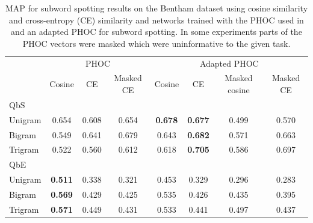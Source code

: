 \documentclass[ms,electronic,twosidetoc,letterpaper,chaptercenter,parttop,lof,lot]{byumsphd}
\begin{document}
\begin{table}
\centering
\begin{tabular}{| l | c c c | c c c c |}
  \hline
   & \multicolumn{3}{c|}{PHOC \cite{sudholt2017}} & \multicolumn{4}{c|}{Adapted PHOC}\\
   & Cosine & CE & Masked CE & Cosine & CE & Masked cosine & Masked CE   \\
  \hline   
  \hline 
  QbS & & & & & & & \\
  \hline
Unigram &  0.654 &  0.608 &  0.654 &  \textbf{0.678} &  \textbf{0.677} &  0.499 &  0.570 \\
Bigram  &  0.549 &  0.641 &  0.679 &  0.643 &  \textbf{0.682} &  0.571 &  0.663 \\
Trigram &  0.522 &  0.560 &  0.612 &  0.618 &  \textbf{0.705} &  0.586 &  0.697 \\
\hline


\hline 
  QbE & & & & & & & \\
  \hline
Unigram &  \textbf{0.511} &  0.338 & 0.321 &  0.453 &  0.329  &  0.296 &  0.283 \\
Bigram  &  \textbf{0.569} &  0.429 & 0.425 &  0.535 &  0.426  &  0.435 &  0.395 \\
Trigram &  \textbf{0.571} &  0.449 & 0.431 &  0.533 &  0.441  &  0.497 &  0.437 \\
\hline

\end{tabular}
\caption{MAP for subword spotting results on the Bentham dataset using cosine similarity and cross-entropy (CE) similarity and networks trained with the PHOC used in \cite{sudholt2017} and an adapted PHOC for subword spotting. In some experiments parts of the PHOC vectors were masked which were uninformative to the given task.}
\label{tab:distmetrics}
\end{table}
\end{document}
